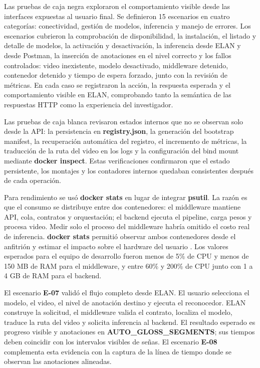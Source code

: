 Las pruebas de caja negra exploraron el comportamiento visible desde las interfaces expuestas al usuario final. Se definieron 15 escenarios en cuatro categorías: conectividad, gestión de modelos, inferencia y manejo de errores. Los escenarios cubrieron la comprobación de disponibilidad, la instalación, el listado y detalle de modelos, la activación y desactivación, la inferencia desde ELAN y desde Postman, la inserción de anotaciones en el nivel correcto y los fallos controlados: video inexistente, modelo desactivado, middleware detenido, contenedor detenido y tiempo de espera forzado, junto con la revisión de métricas. En cada caso se registraron la acción, la respuesta esperada y el comportamiento visible en ELAN, comprobando tanto la semántica de las respuestas HTTP como la experiencia del investigador.

Las pruebas de caja blanca revisaron estados internos que no se observan solo desde la API: la persistencia en \textbf{registry.json}, la generación del bootstrap manifest, la recuperación automática del registro, el incremento de métricas, la traducción de la ruta del video en los logs y la configuración del bind mount mediante \textbf{docker inspect}. Estas verificaciones confirmaron que el estado persistente, los montajes y los contadores internos quedaban consistentes después de cada operación.

Para rendimiento se usó \textbf{docker stats} en lugar de integrar \textbf{psutil}. La razón es que el consumo se distribuye entre dos contenedores: el middleware mantiene API, cola, contratos y orquestación; el backend ejecuta el pipeline, carga pesos y procesa video. Medir solo el proceso del middleware habría omitido el costo real de inferencia. \textbf{docker stats} permitió observar ambos contenedores desde el anfitrión y estimar el impacto sobre el hardware del usuario \cite{docker_cli_stats}. Los valores esperados para el equipo de desarrollo fueron menos de 5\% de CPU y menos de 150 MB de RAM para el middleware, y entre 60\% y 200\% de CPU junto con 1 a 4 GB de RAM para el backend.

El escenario \textbf{E-07} validó el flujo completo desde ELAN. El usuario selecciona el modelo, el video, el nivel de anotación destino y ejecuta el reconocedor. ELAN construye la solicitud, el middleware valida el contrato, localiza el modelo, traduce la ruta del video y solicita inferencia al backend. El resultado esperado es progreso visible y anotaciones en \textbf{AUTO\_GLOSS\_SEGMENTS}; sus tiempos deben coincidir con los intervalos visibles de señas. El escenario \textbf{E-08} complementa esta evidencia con la captura de la línea de tiempo donde se observan las anotaciones alineadas.

